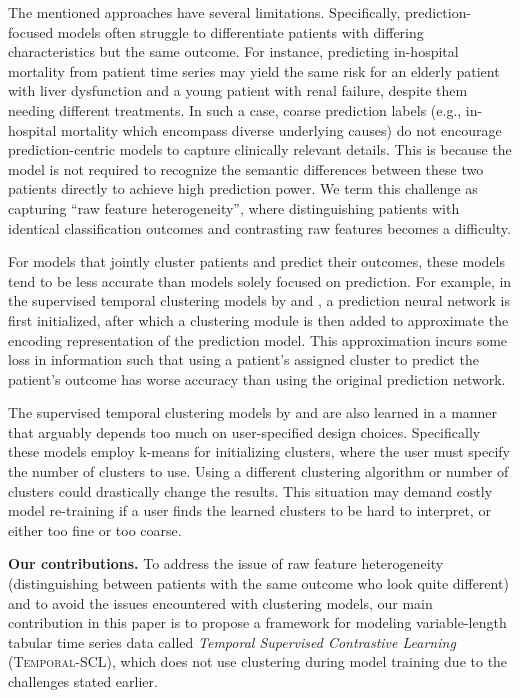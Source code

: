 \documentclass[pmlr,twocolumn,10pt]{jmlr} %
\begin{document}
The mentioned approaches have several limitations. Specifically, prediction-focused models often struggle to differentiate patients with differing characteristics but the same outcome. 
For instance, predicting in-hospital mortality from patient time series may yield the same risk for an elderly patient with liver dysfunction and a young patient with renal failure, despite them needing different treatments.
In such a case, coarse prediction labels (e.g., in-hospital mortality which encompass diverse underlying causes) do not encourage prediction-centric models to capture clinically relevant details. This is because the model is not required to recognize the semantic differences between these two patients directly to achieve high prediction power.
We term this challenge as capturing ``raw feature heterogeneity'', where distinguishing patients with identical classification outcomes and contrasting raw features becomes a difficulty.


For models that jointly cluster patients and predict their outcomes, these models tend to be less accurate than models solely focused on prediction.
For example, in the supervised temporal clustering models by \citet{lee2020temporal} and \citet{aguiar2022learning}, a prediction neural network is first initialized, after which a clustering module is then added to approximate the encoding representation of the prediction model. 
This approximation incurs some loss in information such that using a patient's assigned cluster to predict the patient's outcome has worse accuracy than using the original prediction network.

The supervised temporal clustering models by \citet{lee2020temporal} and \citet{aguiar2022learning} are also learned in a manner that arguably depends too much on user-specified design choices.
Specifically these models employ k-means for initializing clusters, where the user must specify the number of clusters to use. Using a different clustering algorithm or number of clusters could drastically change the results. This situation may demand costly model re-training if a user finds the learned clusters to be hard to interpret, or either too fine or too coarse.

\vspace{.2em}
\noindent
\textbf{Our contributions.}
To address the issue of raw feature heterogeneity (distinguishing between patients with the same outcome who look quite different) and to avoid the issues encountered with clustering models, our main contribution in this paper is to propose a framework for modeling variable-length tabular time series data called \emph{Temporal Supervised Contrastive Learning} (\mbox{\textsc{Temporal-SCL}}), which does not use clustering during model training due to the challenges stated earlier. 
\end{document}
